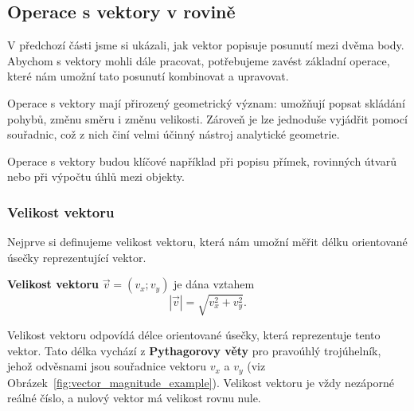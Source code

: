 \subsection{Operace s vektory v rovině}\label{subsec:Vector_operations_in_plane}

V předchozí části jsme si ukázali, jak vektor popisuje posunutí mezi dvěma body.
Abychom s vektory mohli dále pracovat, potřebujeme zavést základní operace,
které nám umožní tato posunutí kombinovat a upravovat.

Operace s vektory mají přirozený geometrický význam:
umožňují popsat skládání pohybů, změnu směru i změnu velikosti.
Zároveň je lze jednoduše vyjádřit pomocí souřadnic,
což z nich činí velmi účinný nástroj analytické geometrie.

Operace s vektory budou klíčové například při popisu přímek,
rovinných útvarů nebo při výpočtu úhlů mezi objekty.


\subsubsection{Velikost vektoru}\label{subsubsec:Vector_magnitude}
Nejprve si definujeme velikost vektoru, která nám umožní měřit délku orientované úsečky reprezentující vektor.

\begin{definition}
    \textbf{Velikost vektoru} $\vec{v} = (v_x; v_y)$ je dána vztahem
    \begin{equation}\label{eq:vector_magnitude}
        |\vec{v}| = \sqrt{v_x^2 + v_y^2}.
    \end{equation}
\end{definition}
Velikost vektoru odpovídá délce orientované úsečky, která reprezentuje tento vektor.
Tato délka vychází z \textbf{Pythagorovy věty} pro pravoúhlý trojúhelník, jehož odvěsnami jsou souřadnice vektoru $v_x$ a $v_y$ (viz Obrázek~\ref{fig:vector_magnitude_example}).
Velikost vektoru je vždy nezáporné reálné číslo, a nulový vektor má velikost rovnu nule.

